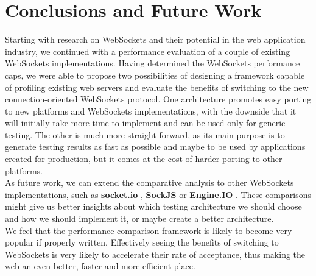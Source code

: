 \documentclass[conference]{IEEEtran}
\begin{document}
\section{Conclusions and Future Work}
Starting with research on WebSockets and their potential in the web application
industry, we continued with a performance evaluation of a couple of existing
WebSockets implementations. Having determined the WebSockets performance caps,
we were able to propose two possibilities of designing a framework capable of
profiling existing web servers and evaluate the benefits of switching to the new 
connection-oriented WebSockets protocol. One architecture promotes easy porting
to new platforms and WebSockets implementations, with the downside that it will
initially take more time to implement and can be used only for generic testing.
The other is much more straight-forward, as its main purpose is to generate
testing results as fast as possible and maybe to be used by applications created
for production, but it comes at the cost of harder porting to other platforms.
\\

As future work, we can extend the comparative analysis to other WebSockets
implementations, such as \textbf{socket.io} \cite{socket.io}, \textbf{SockJS}
\cite{SockJS} or \textbf{Engine.IO} \cite{Engine.IO}. These comparisons might
give us better insights about which testing architecture we should choose and
how we should implement it, or maybe create a better architecture.
\\

We feel that the performance comparison framework is likely to become very popular
if properly written. Effectively seeing the benefits of switching to WebSockets
is very likely to accelerate their rate of acceptance, thus making the web an
even better, faster and more efficient place.

{}

\end{document}
